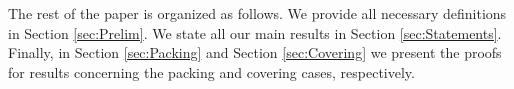\documentclass[11pt]{article}
\begin{document}
 
  
The rest of the paper is organized as follows. We provide all necessary definitions in Section \ref{sec:Prelim}. We state all our main results in Section \ref{sec:Statements}. 
Finally, in Section \ref{sec:Packing} and Section \ref{sec:Covering} we present the proofs for results concerning the packing and covering cases, respectively.
\end{document}
